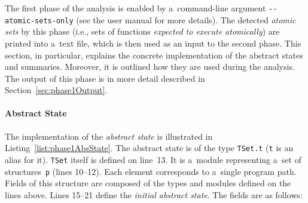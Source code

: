 The first phase of the analysis is enabled by a~command-line argument \texttt{-{}-atomic-sets-only} (see the user manual for more details). The detected \emph{atomic sets} by this phase (i.e., sets of functions \emph{expected to execute atomically}) are printed into a~text file, which is then used as an input to the second phase. This section, in particular, explains the concrete implementation of the abstract states and summaries. Moreover, it is outlined how they are used during the analysis. The output of this phase is in more detail described in Section~\ref{sec:phase1Output}.

\paragraph{Abstract State}
The implementation of the \emph{abstract state} is illustrated in Listing~\ref{list:phase1AbsState}. The abstract state is of the type \texttt{TSet.t} (\texttt{t} is an alias for it). \texttt{TSet} itself is defined on line~13. It is a~module representing a~set of structures~\texttt{p} (lines 10--12). Each element corresponds to a~single program path. Fields of this structure are composed of the types and modules defined on the lines above. Lines 15--21 define the \emph{initial abstract state}. The fields are as follows:
